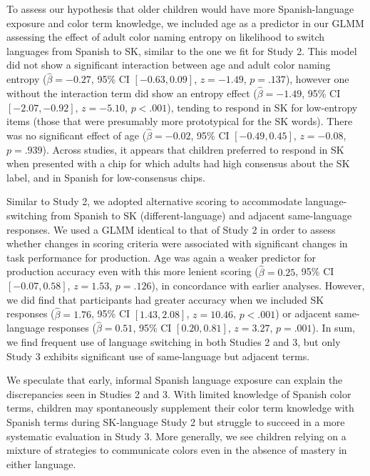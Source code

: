 \documentclass[
  english,
  ,apa7,floatsintext]{apa6}
\begin{document}
To assess our hypothesis that older children would have more Spanish-language exposure and color term knowledge, we included age as a predictor in our GLMM assessing the effect of adult color naming entropy on likelihood to switch languages from Spanish to SK, similar to the one we fit for Study 2. This model did not show a significant interaction between age and adult color naming entropy (\(\hat{\beta} = -0.27\), 95\% CI \([-0.63, 0.09]\), \(z = -1.49\), \(p = .137\)), however one without the interaction term did show an entropy effect (\(\hat{\beta} = -1.49\), 95\% CI \([-2.07, -0.92]\), \(z = -5.10\), \(p < .001\)), tending to respond in SK for low-entropy items (those that were presumably more prototypical for the SK words). There was no significant effect of age (\(\hat{\beta} = -0.02\), 95\% CI \([-0.49, 0.45]\), \(z = -0.08\), \(p = .939\)). Across studies, it appears that children preferred to respond in SK when presented with a chip for which adults had high consensus about the SK label, and in Spanish for low-consensus chips.

Similar to Study 2, we adopted alternative scoring to accommodate language-switching from Spanish to SK (different-language) and adjacent same-language responses. We used a GLMM identical to that of Study 2 in order to assess whether changes in scoring criteria were associated with significant changes in task performance for production. Age was again a weaker predictor for production accuracy even with this more lenient scoring (\(\hat{\beta} = 0.25\), 95\% CI \([-0.07, 0.58]\), \(z = 1.53\), \(p = .126\)), in concordance with earlier analyses. However, we did find that participants had greater accuracy when we included SK responses (\(\hat{\beta} = 1.76\), 95\% CI \([1.43, 2.08]\), \(z = 10.46\), \(p < .001\)) or adjacent same-language responses (\(\hat{\beta} = 0.51\), 95\% CI \([0.20, 0.81]\), \(z = 3.27\), \(p = .001\)). In sum, we find frequent use of language switching in both Studies 2 and 3, but only Study 3 exhibits significant use of same-language but adjacent terms.

We speculate that early, informal Spanish language exposure can explain the discrepancies seen in Studies 2 and 3. With limited knowledge of Spanish color terms, children may spontaneously supplement their color term knowledge with Spanish terms during SK-language Study 2 but struggle to succeed in a more systematic evaluation in Study 3. More generally, we see children relying on a mixture of strategies to communicate colors even in the absence of mastery in either language.
\end{document}
